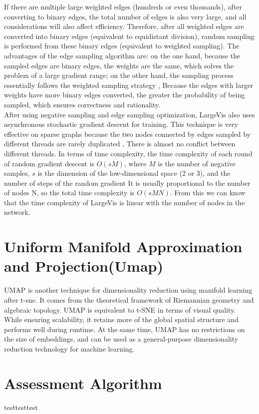 \noindent If there are multiple large weighted edges (hundreds or even thousands), after converting to binary edges, the total number of edges is also very large, and all considerations will also affect efficiency. Therefore, after all weighted edges are converted into binary edges (equivalent to equidistant division), random sampling is performed from these binary edges (equivalent to weighted sampling). The advantages of the edge sampling algorithm are: on the one hand, because the sampled edges are binary edges, the weights are the same, which solves the problem of a large gradient range; on the other hand, the sampling process essentially follows the weighted sampling strategy , Because the edges with larger weights have more binary edges converted, the greater the probability of being sampled, which ensures correctness and rationality.\\

\noindent After using negative sampling and edge sampling optimization, LargeVis also uses asynchronous stochastic gradient descent for training. This technique is very effective on sparse graphs because the two nodes connected by edges sampled by different threads are rarely duplicated , There is almost no conflict between different threads. In terms of time complexity, the time complexity of each round of random gradient descent is $O(sM)$, where $M$ is the number of negative samples, $s$ is the dimension of the low-dimensional space (2 or 3), and the number of steps of the random gradient It is usually proportional to the number of nodes N, so the total time complexity is $O(sMN)$. From this we can know that the time complexity of LargeVis is linear with the number of nodes in the network.

\chapter{Uniform Manifold Approximation and Projection(Umap)}

UMAP is another technique for dimensionality reduction using manifold learning after t-sne. It comes from the theoretical framework of Riemannian geometry and algebraic topology. UMAP is equivalent to t-SNE in terms of visual quality. While ensuring scalability, it retains more of the global spatial structure and performs well during runtime. At the same time, UMAP has no restrictions on the size of embeddings, and can be used as a general-purpose dimensionality reduction technology for machine learning.\\

\chapter{Assessment Algorithm}


testtesttest\\